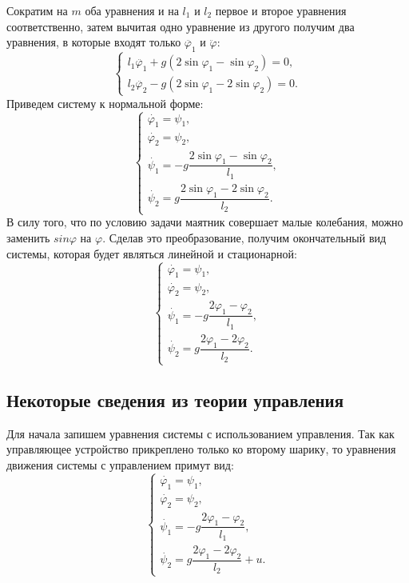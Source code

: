 \documentclass[12pt]{article}
\begin{document}
        Сократим на $m$ оба уравнения и на $l_1$ и $l_2$ первое и второе уравнения соответственно, затем вычитая одно уравнение из другого получим два уравнения, в которые входят только $\ddot{\varphi_1}$ и $\ddot{\varphi}$:
        $$
            \begin{cases}
                l_1 \ddot{\varphi_1} + g (2 \sin \varphi_1 - \sin \varphi_2) = 0, \\
                l_2 \ddot{\varphi_2} - g (2 \sin \varphi_1 - 2 \sin \varphi_2) = 0.
            \end{cases}
        $$
        Приведем систему к нормальной форме:
        $$
            \begin{cases}
                \dot{\varphi_1} = \psi_1, \\
                \dot{\varphi_2} = \psi_2, \\
                \dot{\psi_1} = - g \dfrac{2\sin \varphi_1 - \sin \varphi_2}{l_1}, \\
                \dot{\psi_2} = g \dfrac{2\sin \varphi_1 - 2 \sin \varphi_2}{l_2}.
            \end{cases}
        $$
        В силу того, что по условию задачи маятник совершает малые колебания, можно заменить $sin \varphi$ на $\varphi$. Сделав это преобразование, получим окончательный вид системы, которая будет являться линейной и стационарной:
        $$
            \begin{cases}
                \dot{\varphi_1} = \psi_1, \\
                \dot{\varphi_2} = \psi_2, \\
                \dot{\psi_1} = - g \dfrac{2\varphi_1 - \varphi_2}{l_1}, \\
                \dot{\psi_2} = g \dfrac{2\varphi_1 - 2 \varphi_2}{l_2}.
            \end{cases}
        $$
    \subsection{Некоторые сведения из теории управления}
        Для начала запишем уравнения системы с использованием управления.
        Так как управляющее устройство прикреплено только ко второму шарику, то уравнения движения системы с управлением примут вид:
        $$
            \begin{cases}
                \dot{\varphi_1} = \psi_1, \\
                \dot{\varphi_2} = \psi_2, \\
                \dot{\psi_1} = - g \dfrac{2\varphi_1 - \varphi_2}{l_1}, \\
                \dot{\psi_2} = g \dfrac{2\varphi_1 - 2 \varphi_2}{l_2} + u.
            \end{cases}
        $$
\end{document}
